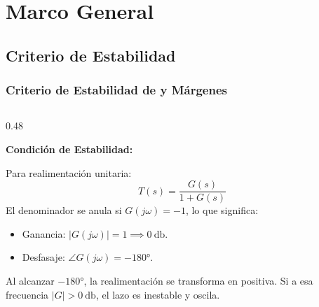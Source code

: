 
\section{Marco General}

\subsection{Criterio de Estabilidad}
\begin{frame}
  \frametitle{Criterio de Estabilidad de y Márgenes}

  \begin{columns}[t, onlytextwidth]
    \begin{column}{0.48\textwidth}
      \begin{tarjeta}
        {\fontsize{9pt}{10.5pt}\selectfont \textbf{\color{NavyDark} Condición de Estabilidad:}}\\[2pt]
        {\fontsize{7.5pt}{9pt}\selectfont
        Para realimentación unitaria:
        \[ T(s) = \frac{G(s)}{1 + G(s)} \]
        El denominador se anula si $G(j\omega) = -1$, lo que significa:
        \begin{itemize}\setlength{\itemsep}{1.5pt}
          \item Ganancia: $|G(j\omega)| = 1 \implies \qty{0}{\decibel}$.
          \item Desfasaje: $\angle G(j\omega) = \ang{-180}$.
        \end{itemize}
        Al alcanzar $\ang{-180}$, la realimentación se transforma en positiva. Si a esa frecuencia $|G| > \qty{0}{\decibel}$, el lazo es inestable y oscila.
        }
      \end{tarjeta}
    \end{column}


\end{columns}
\end{frame}
